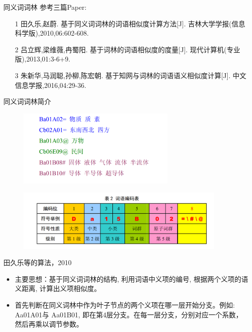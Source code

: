 \documentclass{beamer}
\begin{document}
    \begin{frame}{同义词词林}
    参考三篇Paper: 
    \begin{itemize}
      \item [1]田久乐,赵蔚. 基于同义词词林的词语相似度计算方法[J]. 吉林大学学报(信息科学版),2010,06:602-608. \\
      \item [2]吕立辉,梁维薇,冉蜀阳. 基于词林的词语相似度的度量[J]. 现代计算机(专业版),2013,01:3-6+9. \\
      \item [3]朱新华,马润聪,孙柳,陈宏朝. 基于知网与词林的词语语义相似度计算[J]. 中文信息学报,2016,04:29-36. \\
    \end{itemize}
    \end{frame}

    \begin{frame}{同义词词林简介}
    \begin{center}
      \begin{figure}
      \includegraphics[width=3.1in,height=1.5in]{cilin1.png}
      \end{figure}
      \begin{figure}
      \includegraphics[width=4.1in,height=1.2in]{cilin2.png}
      \end{figure}
      \end{center}
    \end{frame}

    \begin{frame}{田久乐等的算法，2010}
    \begin{center}
      \begin{itemize}
        \item 主要思想：基于同义词词林的结构, 利用词语中义项的编号, 根据两个义项的语义距离, 计算出义项相似度。\\
        \item 首先判断在同义词林中作为叶子节点的两个义项在哪一层开始分支。例如: Aa01A01与 Aa01B01, 即在第4层分支。在每一层分支，分别对应一个系数，然后再乘以调节参数。\\
      \end{itemize}
    \end{center}
    \end{frame}
\end{document}
